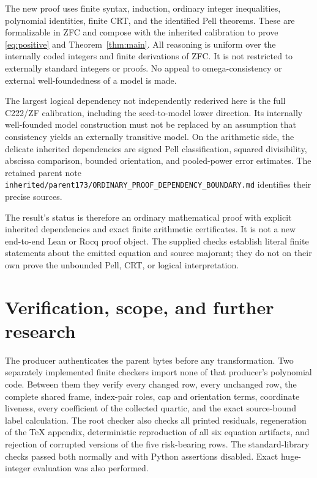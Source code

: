 \documentclass[11pt,a4paper]{article}
\theoremstyle{definition}
\newcommand{\file}[1]{\nolinkurl{#1}}
\begin{document}
The new proof uses finite syntax, induction, ordinary integer inequalities,
polynomial identities, finite CRT, and the identified Pell theorems.
These are formalizable in ZFC and compose with the inherited calibration
to prove \eqref{eq:positive} and Theorem~\ref{thm:main}. All reasoning is
uniform over the internally coded integers and finite derivations of
ZFC. It is not restricted to externally standard integers or proofs.
No appeal to omega-consistency or external well-foundedness of a model
is made.

The largest logical dependency not independently rederived here is the
full C222/ZF calibration, including the seed-to-model lower direction.
Its internally well-founded model construction must not be replaced by
an assumption that consistency yields an externally transitive model.
On the arithmetic side, the delicate inherited dependencies are signed
Pell classification, squared divisibility, abscissa comparison, bounded
orientation, and pooled-power error estimates. The retained parent note
\file{inherited/parent173/ORDINARY_PROOF_DEPENDENCY_BOUNDARY.md} identifies
their precise sources.

The result's status is therefore an ordinary mathematical proof with
explicit inherited dependencies and exact finite arithmetic certificates.
It is not a new end-to-end Lean or Rocq proof object. The supplied
checks establish literal finite statements about the emitted equation
and source majorant; they do not on their own prove the unbounded
Pell, CRT, or logical interpretation.

\section{Verification, scope, and further research}

The producer authenticates the parent bytes before any transformation.
Two separately implemented finite checkers import none of that producer's
polynomial code. Between them they verify every changed row, every
unchanged row, the complete shared frame, index-pair roles, cap and
orientation terms, coordinate liveness, every coefficient of the
collected quartic, and the exact source-bound label calculation.
The root checker also checks all printed residuals, regeneration of the
TeX appendix, deterministic reproduction of all six equation artifacts,
and rejection of corrupted versions of the five risk-bearing rows.
The standard-library checks passed both normally and with Python
assertions disabled. Exact huge-integer evaluation was also performed.
\end{document}
